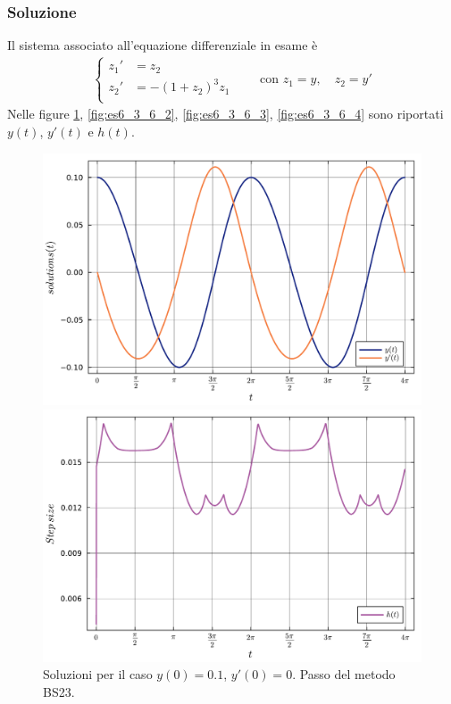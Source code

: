 \documentclass[letterpaper, 12pt]{article}
\numberwithin{equation}{section}    %
\begin{document}
\subsubsection{Soluzione}
Il sistema associato all'equazione differenziale in esame è 
\begin{align*}
\left\{
\begin{array}{rl}
    z_1' &= z_2 \\
    z_2' &= - (1+z_2)^3 z_1 \\
\end{array}
\right.
\qquad \text{con } z_1 = y, \quad z_2 = y'
\end{align*}
Nelle figure \ref{fig:es6_3_6_1}, \ref{fig:es6_3_6_2}, \ref{fig:es6_3_6_3}, \ref{fig:es6_3_6_4} 
sono riportati $y(t)$, $y'(t)$ e $h(t)$.
\begin{figure}[!ht]
    \centering
    \begin{minipage}[b]{0.47\textwidth}
        \includegraphics[width=\textwidth]{6361.pdf}
    \end{minipage}
    \hspace{0.5cm}
    \begin{minipage}[b]{0.47\textwidth}
        \includegraphics[width=\textwidth]{6362.pdf}
    \end{minipage}
    \caption{Soluzioni per il caso $y(0) = 0.1$, $y'(0) = 0$. Passo del metodo BS23.}
    \label{fig:es6_3_6_1}
\end{figure}
\end{document}

